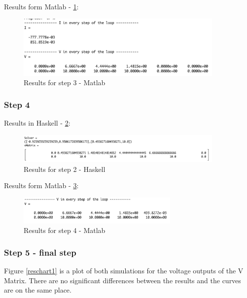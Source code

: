 Results form Matlab - \cref{m3}:

\begin{figure}[H]
   \centering
   \includegraphics[width=0.9\textwidth]{img/m3.png}
   \caption{Results for step 3 - Matlab}
   \label{m3}
\end{figure}


\subsubsection{Step 4}

Results in Haskell - \cref{h5}:

\begin{figure}[H]
   \centering
   \includegraphics[width=0.9\textwidth]{img/h5.png}
   \caption{Results for step 2 - Haskell}
   \label{h5}
\end{figure}

Results form Matlab - \cref{m5}:

\begin{figure}[H]
   \centering
   \includegraphics[width=0.7\textwidth]{img/m5.png}
   \caption{Results for step 4 - Matlab}
   \label{m5}
\end{figure}


\subsubsection{Step 5 - final step}


Figure \ref{reschart1} is a plot of both simulations for the voltage outputs of the V Matrix. There are no significant differences between the results and the curves are on the same place.


